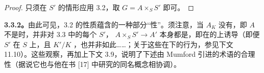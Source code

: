 \begin{proof}
只须在 $S'$ 的情形应用 3.2，取 $G=A\times_SS'$ 即可。
\end{proof}
\textbf{3.3.2。}由此可见，3.2 的性质蕴含的一种部分“性”。须注意，当 $A_K$ 没有，即 $A$ 不是时，并非对 3.3 中的每个 $S'$， $A\times_SS'\to A'$ 本身都是，即在的上诱导（即便 $S'$ 在 $S$ 上，且 $K'/K$ ，也并非如此……；关于这些在下的行为，参见下文 11.10）。这些观察，再加上下文 3.9，说明了下述由 Mumford 引进的术语的合理性（据说它也与他在书 [17] 中研究的同名概念相协调）。

